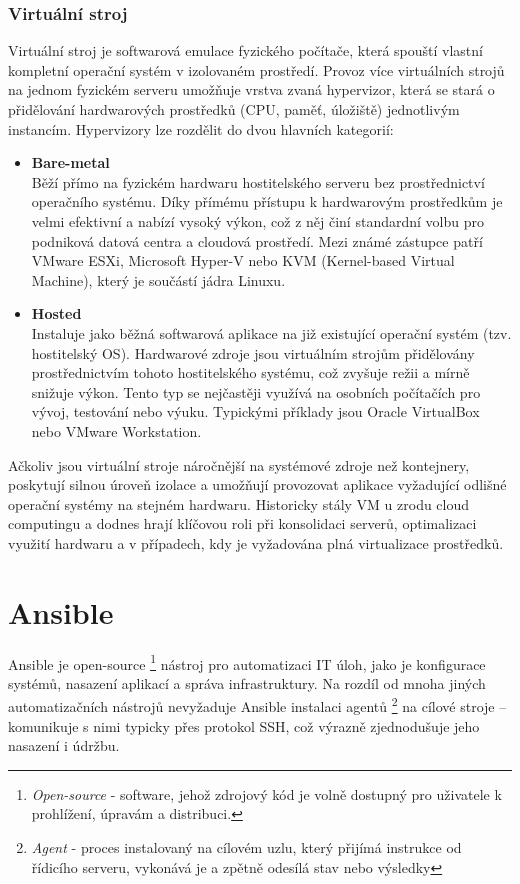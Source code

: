 \subsubsection{Virtuální stroj}
Virtuální stroj je softwarová emulace fyzického počítače, která spouští vlastní kompletní operační systém v izolovaném prostředí. 
Provoz více virtuálních strojů na jednom fyzickém serveru umožňuje vrstva zvaná hypervizor, která se stará o přidělování 
hardwarových prostředků (CPU, paměť, úložiště) jednotlivým instancím. \cite{redhatcontainers}
Hypervizory lze rozdělit do dvou hlavních kategorií:
\begin{itemize}
    \item \textbf{Bare-metal} \\
    Běží přímo na fyzickém hardwaru hostitelského serveru bez prostřednictví operačního systému. Díky přímému přístupu k hardwarovým 
    prostředkům je velmi efektivní a nabízí vysoký výkon, což z něj činí standardní volbu pro podniková datová centra a cloudová prostředí. 
    Mezi známé zástupce patří VMware ESXi, Microsoft Hyper-V nebo KVM (Kernel-based Virtual Machine), který je součástí jádra Linuxu.

    \item \textbf{Hosted} \\
    Instaluje jako běžná softwarová aplikace na již existující operační systém (tzv. hostitelský OS). Hardwarové zdroje jsou 
    virtuálním strojům přidělovány prostřednictvím tohoto hostitelského systému, což zvyšuje režii a mírně snižuje výkon. Tento 
    typ se nejčastěji využívá na osobních počítačích pro vývoj, testování nebo výuku. Typickými příklady jsou Oracle VirtualBox nebo VMware Workstation.
\end{itemize}

Ačkoliv jsou virtuální stroje náročnější na systémové zdroje než kontejnery, poskytují silnou úroveň izolace a 
umožňují provozovat aplikace vyžadující odlišné operační systémy na stejném hardwaru. Historicky stály VM u zrodu cloud computingu a 
dodnes hrají klíčovou roli při konsolidaci serverů, optimalizaci využití hardwaru a v případech, kdy je vyžadována plná virtualizace prostředků.

\section{Ansible}
Ansible je open-source \footnote{\textit{Open-source} - software, jehož zdrojový kód je volně dostupný pro uživatele k prohlížení, úpravám a distribuci.} 
nástroj pro automatizaci IT úloh, jako je konfigurace systémů, nasazení aplikací a správa infrastruktury. 
Na rozdíl od mnoha jiných automatizačních nástrojů nevyžaduje Ansible instalaci agentů \footnote{\textit{Agent} - proces instalovaný na cílovém uzlu, který přijímá instrukce od řídicího serveru, vykonává je a zpětně odesílá stav nebo výsledky} na cílové stroje – komunikuje s 
nimi typicky přes protokol SSH, což výrazně zjednodušuje jeho nasazení i údržbu. \cite{hochstein2017ansible}

